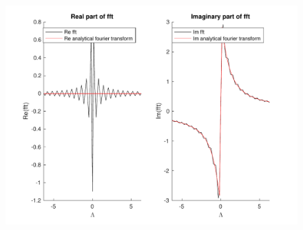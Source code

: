 \documentclass[11pt, oneside, final]{article}
\numberwithin{equation}{section}
\begin{document}
\begin{enumerate}
\begin{figure}[!h]
            \includegraphics[width=\linewidth]{f2fig4}
            \label{pic:f2:4}
        \end{figure} \\
    \end{enumerate}
    \clearpage
    
\end{document}
